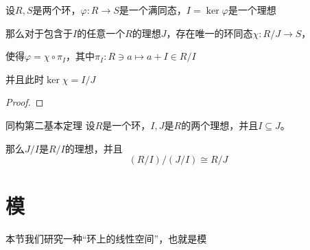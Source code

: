 \documentclass[12pt, a4paper, oneside, UTF8]{ctexbook}
\begin{document}
			\begin{lemma}{}{}
				设$R,S$是两个环，$\varphi : R \rightarrow S$是一个满同态，$I=\ker \varphi$是一个理想

				那么对于包含于$I$的任意一个$R$的理想$J$，存在唯一的环同态$\chi : R/J \rightarrow S$，
				
				使得$\varphi =\chi \circ \pi_I$，其中$\pi_I : R \ni a \mapsto a+I \in R/I$

				并且此时$\ker \chi =I/J$
			\end{lemma}
			\begin{proof}
				
			\end{proof}
			\begin{them}{同构第二基本定理}{}
				设$R$是一个环，$I,J$是$R$的两个理想，并且$I \subseteq J$。

				那么$J/I$是$R/I$的理想，并且
				\begin{equation}
					(R/I)/(J/I) \cong R/J
				\end{equation}
			\end{them}
	\section{模}
		本节我们研究一种“环上的线性空间”，也就是模
\end{document}
